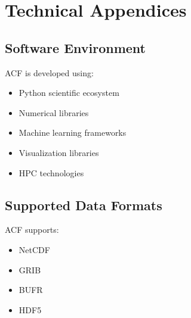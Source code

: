 \chapter{Technical Appendices}


\section{Software Environment}


ACF is developed using:

\begin{itemize}

\item Python scientific ecosystem

\item Numerical libraries

\item Machine learning frameworks

\item Visualization libraries

\item HPC technologies

\end{itemize}



\section{Supported Data Formats}


ACF supports:

\begin{itemize}

\item NetCDF

\item GRIB

\item BUFR

\item HDF5

\end{itemize}
